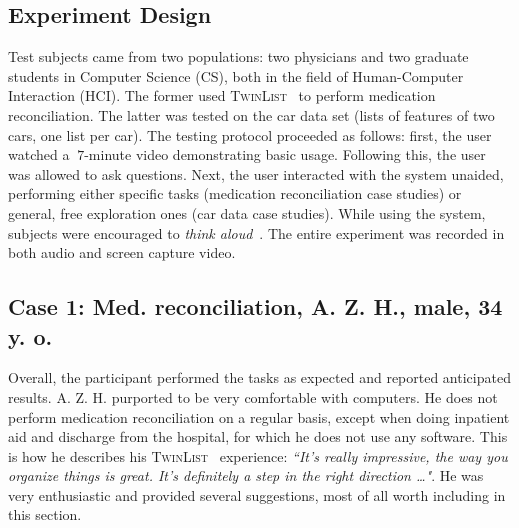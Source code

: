 \documentclass{chi2009}
\newcommand{\TwinList}{\textsc{TwinList}}
\begin{document}
\subsection{Experiment Design}
Test subjects came from two populations: two physicians and two graduate students in Computer Science (CS), both in the field of Human-Computer Interaction (HCI). The former used \TwinList~ to perform medication reconciliation. The latter was tested on the car data set (lists of features of two cars, one list per car). The testing protocol proceeded as follows: first, the user watched a $~7$-minute video demonstrating basic usage. Following this, the user was allowed to ask questions. Next, the user interacted with the system unaided, performing either specific tasks (medication reconciliation case studies) or general, free exploration ones (car data case studies). While using the system, subjects were encouraged to \textit{think aloud}~\cite{lewis-1982}. The entire experiment was recorded in both audio and screen capture video. 

\subsection{Case 1: Med. reconciliation, A. Z. H., male, 34 y. o.}
Overall, the participant performed the tasks as expected and reported anticipated results. A. Z. H. purported to be very comfortable with computers. He does not perform medication reconciliation on a regular basis, except when doing inpatient aid and discharge from the hospital, for which he does not use any software. This is how he describes his \TwinList~ experience: \textit{``It's really impressive, the way you organize things is great. It's definitely a step in the right direction \dots"}. He was very enthusiastic and provided several suggestions, most of all worth including in this section. 
\end{document}
